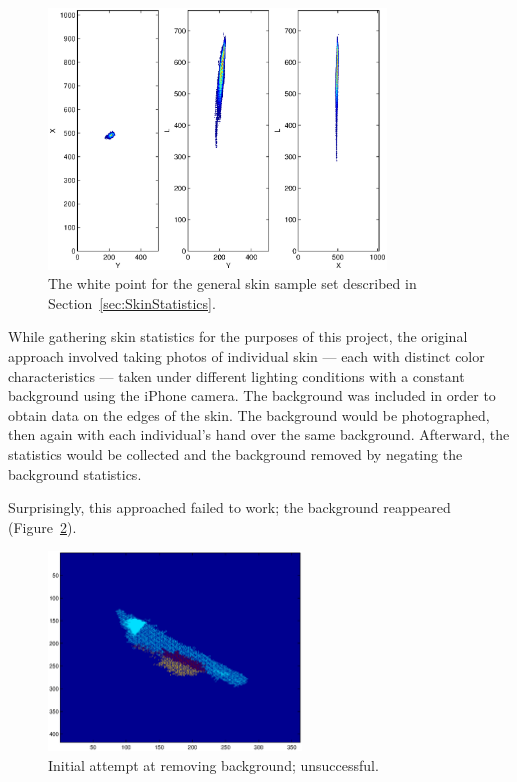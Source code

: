 \begin{figure}[h!]
  \centering
    \includegraphics[width=0.80\textwidth]{Chapter2/Figs/lxy_general_white_point.eps}
    \caption{The white point for the general skin sample set described in Section~\ref{sec:SkinStatistics}.}  \label{fig:WhitePoint}
\end{figure}

While gathering skin statistics for the purposes of this project, the original approach involved taking photos of individual skin --- each with distinct color characteristics --- taken under different lighting conditions with a constant background using the iPhone camera. The background was included in order to obtain data on the edges of the skin. The background would be photographed, then again with each individual's hand over the same background. Afterward, the statistics would be collected and the background removed by negating the background statistics.

Surprisingly, this approached failed to work; the background reappeared (Figure~\ref{fig:BGFailure}).

\begin{figure}[h!]
  \centering
    \includegraphics[width=0.60\textwidth]{Chapter2/Figs/xy_bg_failed.eps}
    \caption{Initial attempt at removing background; unsuccessful.} \label{fig:BGFailure}
\end{figure}

